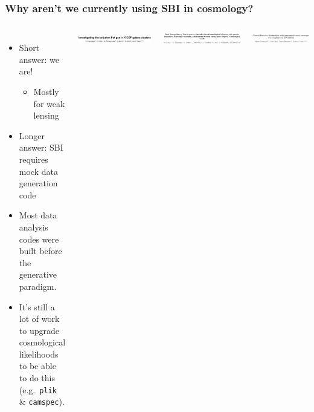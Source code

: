 \documentclass[aspectratio=169]{beamer}
\begin{document}
\begin{frame}
    \frametitle{Why aren't we currently using SBI in cosmology?}
    \begin{columns}
        \begin{itemize}
            \item Short answer: we are!
                \begin{itemize}
                    \item Mostly for weak lensing
                \end{itemize}
            \item Longer answer: SBI requires mock data generation code
            \item Most data analysis codes were built before the generative paradigm.
            \item It's still a lot of work to upgrade cosmological likelihoods  to be able to do this (e.g.\ \texttt{plik} \& \texttt{camspec}).
        \end{itemize}
        \includegraphics[width=\textwidth]{figures/sbi_papers/clusters.pdf}
        \vspace{10pt}

        \includegraphics[width=\textwidth]{figures/sbi_papers/des.pdf}
        \vspace{10pt}

        \includegraphics[width=\textwidth]{figures/sbi_papers/gw.pdf}
        \vspace{10pt}


\end{columns}
\end{frame}
\end{document}
